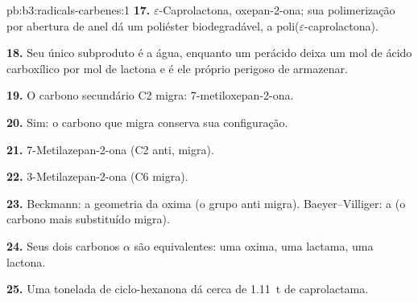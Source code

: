 \begin{solution}{pb:b3:radicals-carbenes:1}
\textbf{17.} $\varepsilon$-Caprolactona, oxepan-2-ona; sua polimerização por abertura de anel dá um
poliéster biodegradável, a poli($\varepsilon$-caprolactona).

\textbf{18.} Seu único subproduto é a água, enquanto um perácido deixa um mol de
ácido carboxílico por mol de lactona e é ele próprio perigoso de armazenar.

\textbf{19.} O carbono secundário C2 migra: 7-metiloxepan-2-ona.

\textbf{20.} Sim: o carbono que migra conserva sua configuração.

\textbf{21.} 7-Metilazepan-2-ona (C2 anti, migra).

\textbf{22.} 3-Metilazepan-2-ona (C6 migra).

\textbf{23.} Beckmann: a geometria da oxima (o grupo anti migra).
Baeyer--Villiger: a  (o carbono mais substituído migra).

\textbf{24.} Seus dois carbonos $\alpha$ são equivalentes: uma oxima, uma lactama, uma lactona.

\textbf{25.} Uma tonelada de ciclo-hexanona dá cerca de \qty{1.11}{t} de caprolactama.
\end{solution}
